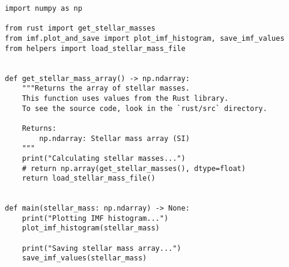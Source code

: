 \begin{lstlisting}
import numpy as np

from rust import get_stellar_masses
from imf.plot_and_save import plot_imf_histogram, save_imf_values
from helpers import load_stellar_mass_file


def get_stellar_mass_array() -> np.ndarray:
    """Returns the array of stellar masses.
    This function uses values from the Rust library.
    To see the source code, look in the `rust/src` directory.

    Returns:
        np.ndarray: Stellar mass array (SI)
    """
    print("Calculating stellar masses...")
    # return np.array(get_stellar_masses(), dtype=float)
    return load_stellar_mass_file()


def main(stellar_mass: np.ndarray) -> None:
    print("Plotting IMF histogram...")
    plot_imf_histogram(stellar_mass)

    print("Saving stellar mass array...")
    save_imf_values(stellar_mass)
\end{lstlisting}